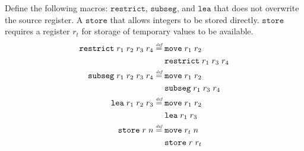 \documentclass[a4paper]{article}
\newcommand{\defeq}{\stackrel{\textit{\tiny{def}}}{=}}
\newcommand\dominique[1]{{\color{purple} \sf \footnotesize {DD: #1}}\\}
\renewcommand\dominique[1]{}
\newcommand{\var}[1]{\mathit{#1}}
\newcommand{\rv}{\var{rv}}
\newcommand{\zinstr}[1]{\mathtt{#1}}
\newcommand{\twoinstr}[3]{\zinstr{#1} \; #2 \; #3}
\newcommand{\move}[2]{\twoinstr{move}{#1}{#2}}
\newcommand{\store}[2]{\twoinstr{store}{#1}{#2}}
\newcommand{\lea}[2]{\twoinstr{lea}{#1}{#2}}
\newcommand{\threeinstr}[4]{\zinstr{#1} \; #2 \; #3 \; #4}
\newcommand{\restrict}[3]{\threeinstr{restrict}{#1}{#2}{#3}}
\newcommand{\subseg}[3]{\threeinstr{subseg}{#1}{#2}{#3}}
\begin{document}
\dominique{why doesn't store take an $\rv$?}


\begin{comment}
After adding local capabilities, most of the definitions have changed slightly to take into account the new form the capabilities take. The only two instructions that have undergone enough change to deserve to be mentioned are $\mathtt{store}$ and $\mathtt{restrict}$. 

$\mathtt{store}$ has the same conditions as before, but if what we try to write is a local capability, then it needs to be a write access that permits write local.

$\mathtt{restrict}$ looks like before, but now it uses a ``permission pair'' which is the access permission and the locality. Whether a $\mathtt{restrict}$ succeeds depends on the ordering, so the real change lies in the new ordering, which is described further above (it is the point-wise ordering of the pair).
\end{comment}
Define the following macros: $\mathtt{restrict}$, $\mathtt{subseg}$, and $\mathtt{lea}$ that does not overwrite the source register. A $\mathtt{store}$ that allows integers to be stored directly. $\mathtt{store}$ requires a register $r_t$ for storage of temporary values to be available.
\begin{align*}
  \restrict{r_1}{r_2}{r_3} \; r_4 &\defeq
                                    \begin{aligned}[t]
                                      & \move{r_1}{r_2} \\
                                      & \restrict{r_1}{r_3}{r_4}
                                    \end{aligned} \\
  \subseg{r_1}{r_2}{r_3} \; r_4   &\defeq
                                    \begin{aligned}[t]
                                      & \move{r_1}{r_2} \\
                                      & \subseg{r_1}{r_3}{r_4}
                                    \end{aligned}\\
  \lea{r_1}{r_2} \; r_3           &\defeq
                                    \begin{aligned}[t]
                                      & \move{r_1}{r_2} \\
                                      & \lea{r_1}{r_3}
                                    \end{aligned}\\
  \store{r}{n} &\defeq
                 \begin{aligned}[t]
                   & \move{r_t}{n} \\
                   & \store{r}{r_t}
                 \end{aligned}
\end{align*}
\end{document}
